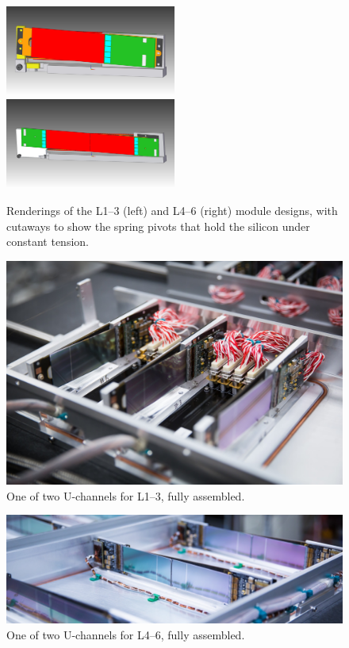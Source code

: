 \begin{figure}[ht]
    \includegraphics[width=0.5\textwidth]{detector/figs/svt_l123_drawing}
    \includegraphics[width=0.5\textwidth]{detector/figs/svt_l456_drawing}
    \caption{Renderings of the L1--3 (left) and L4--6 (right) module designs, with cutaways to show the spring pivots that hold the silicon under constant tension.}
    \label{fig:svt-module-drawing}
\end{figure}

\begin{figure}[ht]
    \includegraphics[width=\textwidth]{detector/figs/l123}
    \caption{One of two U-channels for L1--3, fully assembled.}
    \label{fig:l123}
\end{figure}

\begin{figure}[ht]
    \includegraphics[width=\textwidth]{detector/figs/l456}
    \caption{One of two U-channels for L4--6, fully assembled.}
    \label{fig:l456}
\end{figure}

